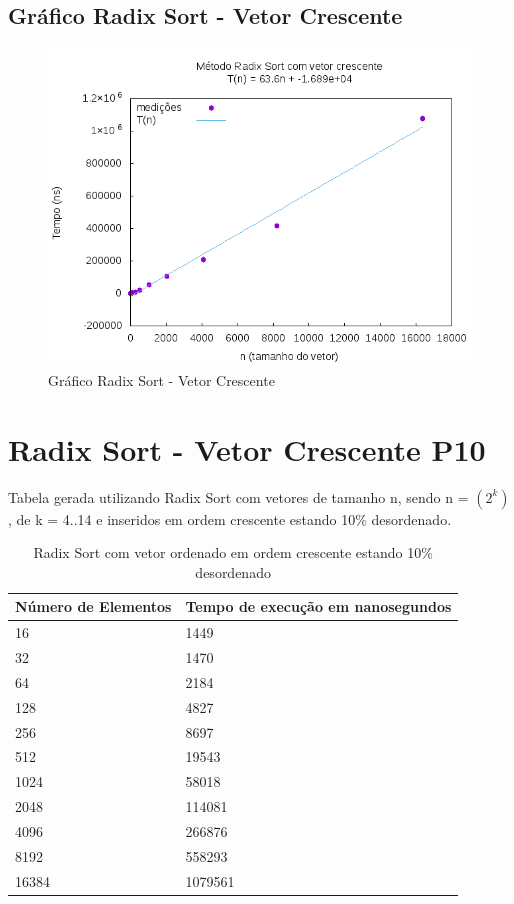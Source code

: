 \documentclass[12pt,a4paper,twoside]{report}
\begin{document}
\subsection{Gráfico Radix Sort - Vetor Crescente}
\begin{figure}[H]
    \centering
    \includegraphics[width=0.7\linewidth]{graficos/RadixSort/vIntCrescente/vIntCrescente.png}
  \caption{Gráfico Radix Sort - Vetor Crescente}
\end{figure}

\section{Radix Sort - Vetor Crescente P10}
Tabela gerada utilizando Radix Sort com vetores de tamanho n, sendo n = $(2^k)$, de k = 4..14 e inseridos em ordem crescente estando 10\% desordenado.
\begin{table}[H]
\centering
\caption{Radix Sort com vetor ordenado em ordem crescente estando 10\% desordenado}
\label{my-label}
\begin{tabular}{|l|l|}
\hline
\multicolumn{1}{|c|}{\textbf{Número de Elementos}} & \multicolumn{1}{c|}{\textbf{Tempo de execução em nanosegundos}} \\ \hline
16 & 1449 \\ \hline
32 & 1470 \\ \hline
64 & 2184 \\ \hline
128 & 4827 \\ \hline
256 & 8697 \\ \hline
512 & 19543 \\ \hline
1024 & 58018 \\ \hline
2048 & 114081 \\ \hline
4096 & 266876 \\ \hline
8192 & 558293 \\ \hline
16384 & 1079561 \\ \hline
\end{tabular}
\end{table}
\end{document}
